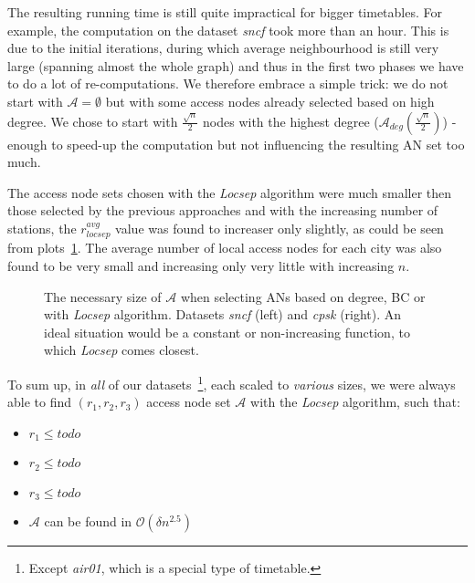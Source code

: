 		The resulting running time is still quite impractical for bigger timetables. For example, the computation on the dataset \textit{sncf} took more than an hour. This is due to the initial iterations, during which average neighbourhood is still very large (spanning almost the whole graph) and thus in the first two phases we have to do a lot of re-computations. We therefore embrace a simple trick: we do not start with $\mathcal{A} = \emptyset$ but with some access nodes already selected based on high degree. We chose to start with $\frac{\sqrt{n}}{2}$ nodes with the highest degree ($\mathcal{A}_{deg}(\frac{\sqrt{n}}{2})$) - enough to speed-up the computation but not influencing the resulting AN set too much. 
		
		The access node sets chosen with the \textit{Locsep} algorithm were much smaller then those selected by the previous approaches and with the increasing number of stations, the $r_{locsep}^{avg}$ value was found to increaser only slightly, as could be seen from plots~\ref{plot:locsep-size}. The average number of local access nodes for each city was also found to be very small and increasing only very little with increasing $n$. \\
		
		\begin{figure}[h!]
		\centering
	    \caption{\label{plot:locsep-size} The necessary size of $\mathcal{A}$ when selecting ANs based on degree, BC or with \textit{Locsep} algorithm. Datasets \textit{sncf} (left) and \textit{cpsk} (right). An ideal situation would be a constant or non-increasing function, to which \textit{Locsep} comes closest.}
		\end{figure}				
		
		\noindent To sum up, in \textit{all} of our datasets~\footnote{Except \textit{air01}, which is a special type of timetable.}, each scaled to \textit{various} sizes, we were always able to find $(r_{1}, r_{2}, r_{3})$ access node set $\mathcal{A}$ with the \textit{Locsep} algorithm, such that:
		\begin{itemize}
			\item $r_{1} \leq todo$
			\item $r_{2} \leq todo$
			\item $r_{3} \leq todo$
			\item $\mathcal{A}$ can be found in $\mathcal{O}(\delta n^{2.5})$
		\end{itemize}
		\hspace*{\fill}
		
